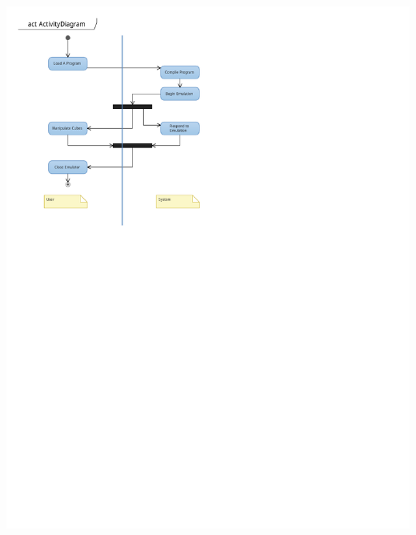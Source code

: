 \documentclass[12pt]{article}
\begin{document}
\begin{center}
        \includegraphics[scale=1]{./pdfs/MS5Models/ActivityDiagram.pdf}
\end{center}
\end{document}

